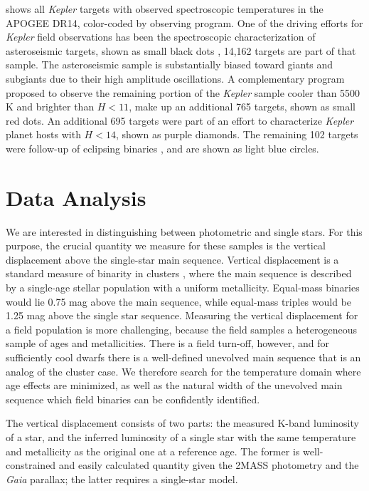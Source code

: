 \documentclass[manuscript]{aastex6}
\newcommand{\Kepler}{\mbox{\textit{Kepler}}}
\newcommand{\Gaia}{\mbox{\textit{Gaia}}}
\begin{document}
 shows all \Kepler{} targets with observed
spectroscopic temperatures in the APOGEE DR14, color-coded by observing
program. One of the driving efforts for \Kepler{} field observations has been
the spectroscopic characterization of asteroseismic targets, shown as small
black dots \citep{Zasowski17,Pinsonneault18}, 14,162 targets are part of that
sample. The asteroseismic sample is substantially biased toward giants 
and subgiants due to their high amplitude oscillations. A complementary 
program proposed to observe the remaining portion of the \Kepler{} sample 
cooler than 5500 K and brighter than \(H < 11\), make up an additional 765 
targets, shown as small red dots. An additional 695 targets were part of an 
effort to characterize \Kepler{} planet hosts with \(H < 14\), shown as purple 
diamonds. The remaining 102 targets were follow-up of eclipsing binaries 
\citep{Prsa11,Slawson11}, and are shown as light blue circles.  

\section{Data Analysis}
\label{sec:analysis}

We are interested in distinguishing between photometric and single stars. For
this purpose, the crucial quantity we measure for these samples is the 
vertical displacement above the single-star main sequence. Vertical 
displacement is a standard measure of binarity in clusters 
\citep{Mermilliod92}, where the main sequence is described by a
single-age stellar population with a uniform metallicity. Equal-mass binaries
would lie 0.75 mag above the main sequence, while equal-mass triples would be
1.25 mag above the single star sequence. Measuring the
vertical displacement for a field population is more challenging, because the
field samples a heterogeneous sample of ages and metallicities. There is a
field turn-off, however, and for sufficiently cool dwarfs there is a
well-defined unevolved main sequence that is an analog of the cluster case. We
therefore search for the temperature domain where age effects are minimized, as
well as the natural width of the unevolved main sequence which field binaries
can be confidently identified.

The vertical displacement consists of two parts: the measured K-band
luminosity of a star, and the inferred luminosity of a single star with the
same temperature and metallicity as the original one at a reference age. The 
former is well-constrained and easily calculated quantity given the 2MASS 
photometry and the \Gaia{} parallax; the latter requires a single-star model.
\end{document}
